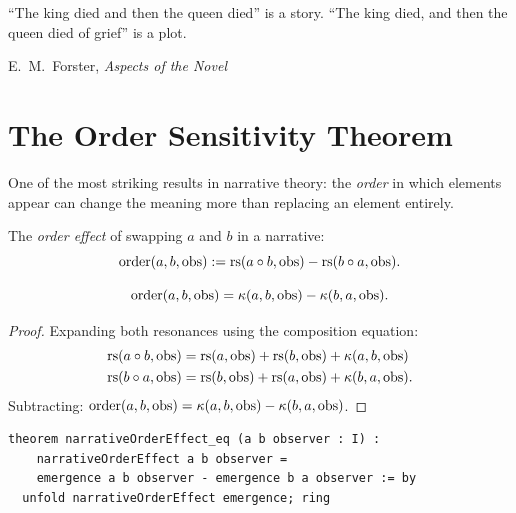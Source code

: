 \epigraph{``The king died and then the queen died'' is a story.
``The king died, and then the queen died of grief'' is a plot.}{E.\ M.\ Forster, \textit{Aspects of the Novel}}

\section{The Order Sensitivity Theorem}

One of the most striking results in narrative theory: the \emph{order}
in which elements appear can change the meaning more than replacing
an element entirely.

\begin{definition}
The \emph{order effect} of swapping $a$ and $b$ in a narrative:
\[
  \mathrm{order}(a, b, \mathrm{obs}) :=
  \mathrm{rs}(a \circ b, \mathrm{obs}) - \mathrm{rs}(b \circ a, \mathrm{obs}).
\]
\end{definition}

\begin{theorem}
\label{thm:order-emergence}
\[
  \mathrm{order}(a, b, \mathrm{obs}) =
  \kappa(a, b, \mathrm{obs}) - \kappa(b, a, \mathrm{obs}).
\]
\end{theorem}

\begin{proof}
Expanding both resonances using the composition equation:
\begin{align*}
  \mathrm{rs}(a \circ b, \mathrm{obs}) &= \mathrm{rs}(a, \mathrm{obs}) + \mathrm{rs}(b, \mathrm{obs})
    + \kappa(a, b, \mathrm{obs}) \\
  \mathrm{rs}(b \circ a, \mathrm{obs}) &= \mathrm{rs}(b, \mathrm{obs}) + \mathrm{rs}(a, \mathrm{obs})
    + \kappa(b, a, \mathrm{obs}).
\end{align*}
Subtracting:
$\mathrm{order}(a, b, \mathrm{obs}) = \kappa(a, b, \mathrm{obs}) - \kappa(b, a, \mathrm{obs})$.
\end{proof}

\begin{lstlisting}
theorem narrativeOrderEffect_eq (a b observer : I) :
    narrativeOrderEffect a b observer =
    emergence a b observer - emergence b a observer := by
  unfold narrativeOrderEffect emergence; ring
\end{lstlisting}

